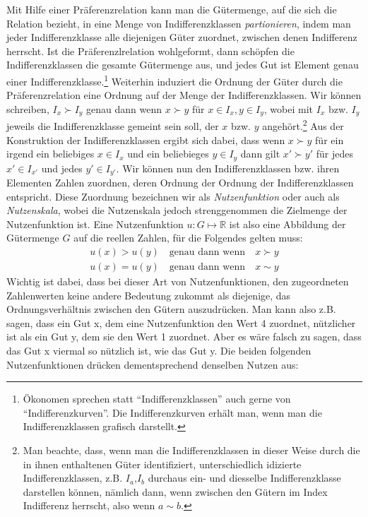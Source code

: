 Mit Hilfe einer Präferenzrelation kann man die Gütermenge, auf die sich die
Relation bezieht, in eine Menge von Indifferenzklassen {\em partionieren}, indem
man jeder Indifferenzklasse alle diejenigen Güter zuordnet, zwischen denen
Indifferenz herrscht.  Ist die
Präferenzlrelation wohlgeformt, dann schöpfen die Indifferenzklassen die gesamte
Gütermenge aus, und jedes Gut ist Element genau einer
Indifferenzklasse.\footnote{Ökonomen sprechen statt "`Indifferenzklassen"' auch
gerne von "`Indifferenzkurven"'. Die Indifferenzkurven erhält man, wenn man die
Indifferenzklassen grafisch darstellt.} Weiterhin induziert die Ordnung der Güter
durch die Präferenzrelation eine Ordnung auf der Menge der Indifferenzklassen.
Wir können schreiben, $I_x \succ I_y$ genau dann wenn $x \succ y$ für $x \in I_x,
y \in I_y$, wobei mit $I_x$ bzw. $I_y$ jeweils die Indifferenzklasse gemeint sein
soll, der $x$ bzw. $y$ angehört.\footnote{Man beachte, dass, wenn man die
Indifferenzklassen in dieser Weise durch die in ihnen enthaltenen Güter
identifiziert, unterschiedlich idizierte Indifferenzklassen, z.B. $I_a$,$I_b$
durchaus ein- und diesselbe Indifferenzklasse darstellen können, nämlich dann,
wenn zwischen den Gütern im Index Indifferenz herrscht, also wenn $a \sim b$.}
Aus der Konstruktion der Indifferenzklassen ergibt sich dabei, dass wenn $x \succ
y$ für ein irgend ein beliebiges $x \in I_x$ und ein beliebieges $y \in I_y$ dann
gilt $x' \succ y'$ für jedes $x' \in I_{x'}$ und jedes $y' \in I_{y'}$. Wir
können nun den Indifferenzklassen bzw. ihren Elementen Zahlen zuordnen, deren
Ordnung der Ordnung der Indifferenzklassen entspricht.
Diese Zuordnung bezeichnen wir als {\em Nutzenfunktion} oder auch als {\em
Nutzenskala}, wobei die Nutzenskala jedoch strenggenommen die Zielmenge der
Nutzenfunktion ist. Eine Nutzenfunktion $u: G \mapsto \mathbb{R}$ ist also eine
Abbildung der Gütermenge $G$ auf die reellen Zahlen, für die Folgendes gelten
muss:
\begin{eqnarray}
u(x) > u(y)  \quad\mbox{genau dann wenn}\quad  x \succ y \\
u(x) = u(y)  \quad\mbox{genau dann wenn}\quad  x \sim y
\end{eqnarray}
Wichtig ist dabei, dass bei dieser Art von Nutzenfunktionen, den zugeordneten
Zahlenwerten keine andere Bedeutung zukommt als diejenige, das
Ordnungsverhältnis zwischen den Gütern auszudrücken. Man kann also z.B. sagen,
dass ein Gut x, dem eine Nutzenfunktion den Wert 4 zuordnet, nützlicher ist als
ein Gut y, dem sie den Wert 1 zuordnet. Aber es wäre falsch zu sagen, dass das
Gut x viermal so nützlich ist, wie das Gut y. Die beiden folgenden
Nutzenfunktionen drücken dementsprechend denselben Nutzen aus:

